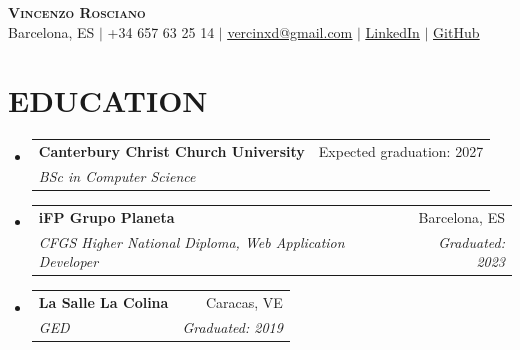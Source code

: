 \documentclass[letterpaper,11pt]{article}
\makeatletter
\newcommand{\resumeSubheading}[4]{
  \vspace{-2pt}\item
    \begin{tabular*}{0.97\textwidth}[t]{l@{\extracolsep{\fill}}r}
      \textbf{#1} & #2 \\
      \textit{\small#3} & \textit{\small #4} \\
    \end{tabular*}\vspace{-7pt}
}
\newcommand{\resumeSubHeadingListStart}{\begin{itemize}[leftmargin=0.15in, label={}]}
\newcommand{\resumeSubHeadingListEnd}{\end{itemize}}
\makeatother
\begin{document}
\begin{center}
  \textbf{\Huge \scshape Vincenzo Rosciano} \\ \vspace{1pt}
  \small Barcelona, ES $|$ +34 657 63 25 14 $|$
  \href{mailto:vercinxd@gmail.com}{\underline{vercinxd@gmail.com}} $|$
  \href{https://www.linkedin.com/in/vincenzo-carlo-rosciano/}{\underline{LinkedIn}} $|$
  \href{https://github.com/vercinbleach}{\underline{GitHub}}
\end{center}

\section{EDUCATION}
  \resumeSubHeadingListStart
    \resumeSubheading
      {Canterbury Christ Church University}{Expected graduation: 2027}
      {BSc in Computer Science}{}
    \resumeSubheading
      {iFP Grupo Planeta}{Barcelona, ES}
      {CFGS Higher National Diploma, Web Application Developer}{Graduated: 2023}
    \resumeSubheading
      {La Salle La Colina}{Caracas, VE}
      {GED}{Graduated: 2019}
  \resumeSubHeadingListEnd
\end{document}
